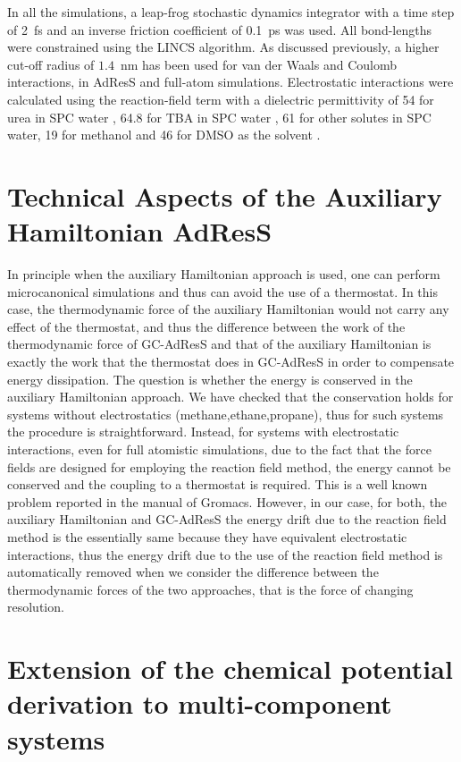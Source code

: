 \documentclass[a4paper,preprint,unsortedaddress]{revtex4-1}
\newcommand{\recheck}[1]{{\color{red} #1}}
\begin{document}
In all the simulations, a leap-frog stochastic dynamics integrator with a time step
of 2~fs and an inverse friction coefficient of 0.1~ps was used. All bond-lengths were constrained using the LINCS 
algorithm. \recheck{As discussed previously, a higher cut-off radius of $1.4$~nm has been used for van der Waals and Coulomb interactions,
in AdResS and full-atom simulations}. 
Electrostatic interactions  were calculated using the reaction-field term \cite{rf} with a dielectric 
permittivity of 54 for urea in SPC water \cite{urea}, 64.8 for TBA in SPC water \cite{nico}, 61 for other solutes in SPC
water, 19 for methanol and 46 for DMSO as the solvent \cite{vang}.

\section{Technical Aspects of the Auxiliary Hamiltonian AdResS}\label{app:tmp2}
\recheck{In principle when the auxiliary Hamiltonian approach is used,
  one can perform microcanonical simulations and thus can avoid the
  use of a thermostat. In this case, the thermodynamic force of the
  auxiliary Hamiltonian would not carry any effect of the thermostat, and thus the difference between the work of the thermodynamic force of GC-AdResS and that of the auxiliary Hamiltonian is
  exactly the work that the thermostat does in GC-AdResS in order to compensate energy dissipation. The question is whether
  the energy is conserved in the auxiliary Hamiltonian approach. We
  have checked that the conservation holds for systems without
  electrostatics (methane,ethane,propane), thus for such systems the
  procedure is straightforward. Instead, for systems with
  electrostatic interactions, even for full atomistic simulations, due
  to the fact that the force fields are designed for employing the
  reaction field method, the energy cannot be conserved and the
  coupling to a thermostat is required. This is a well known problem
  reported in the manual of Gromacs. However, in our case, for both,
  the auxiliary Hamiltonian and GC-AdResS the energy drift due to the
  reaction field method is the essentially same because they have
  equivalent electrostatic interactions, thus the energy drift due to
  the use of the reaction field method is automatically removed when
  we consider the difference between the thermodynamic forces of the
  two approaches, that is the force of changing resolution.}


\section{Extension of the chemical potential derivation to multi-component systems}\label{app:tmp3}
\end{document}
